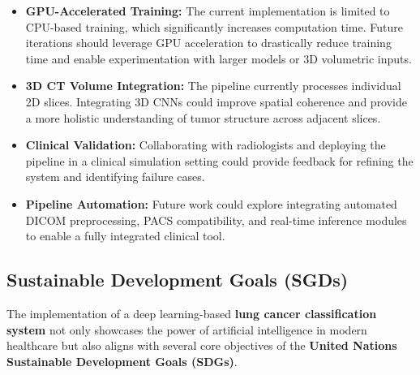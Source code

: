 \begin{itemize}
    \item \textbf{GPU-Accelerated Training:} The current implementation is limited to CPU-based 
    training, which significantly increases computation time. Future iterations should leverage GPU 
    acceleration to drastically reduce training time and enable experimentation with larger models 
    or 3D volumetric inputs.
    
    \item \textbf{3D CT Volume Integration:} The pipeline currently processes individual 2D slices. 
    Integrating 3D CNNs could improve spatial coherence and provide a more holistic understanding 
    of tumor structure across adjacent slices.
    
    \item \textbf{Clinical Validation:} Collaborating with radiologists and deploying the pipeline 
    in a clinical simulation setting could provide feedback for refining the system and identifying 
    failure cases.
    
    \item \textbf{Pipeline Automation:} Future work could explore integrating automated DICOM 
    preprocessing, PACS compatibility, and real-time inference modules to enable a fully integrated 
    clinical tool.
\end{itemize}


\subsection{Sustainable Development Goals (SGDs)}

The implementation of a deep learning-based \textbf{lung cancer classification system} not only 
showcases the power of artificial intelligence in modern healthcare but also aligns with several 
core objectives of the \textbf{United Nations Sustainable Development Goals (SDGs)}.

